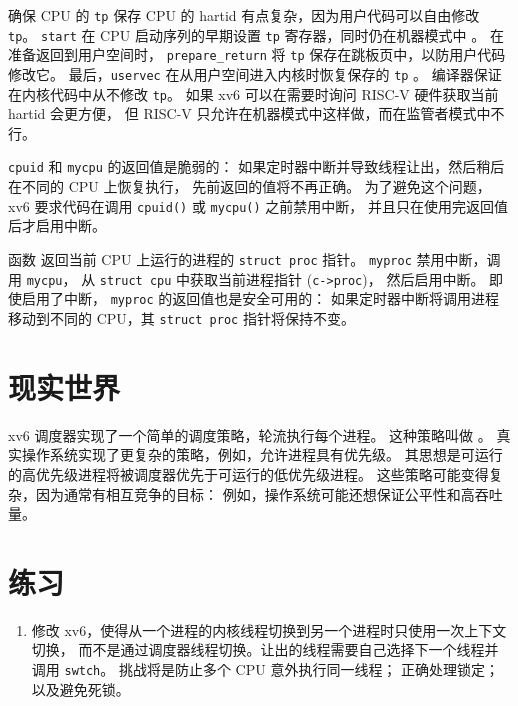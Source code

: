 确保 CPU 的 \lstinline{tp} 保存 CPU 的 hartid 有点复杂，因为用户代码可以自由修改 \lstinline{tp}。
\lstinline{start} 在 CPU 启动序列的早期设置 \lstinline{tp}
寄存器，同时仍在机器模式中
。
在准备返回到用户空间时，
\lstinline{prepare_return} 将 \lstinline{tp} 保存在跳板页中，以防用户代码修改它。
最后，\lstinline{uservec} 在从用户空间进入内核时恢复保存的 \lstinline{tp}
。
编译器保证在内核代码中从不修改 \lstinline{tp}。
如果 xv6 可以在需要时询问 RISC-V 硬件获取当前 hartid 会更方便，
但 RISC-V 只允许在机器模式中这样做，而在监管者模式中不行。

\lstinline{cpuid}
和
\lstinline{mycpu}
的返回值是脆弱的：
如果定时器中断并导致线程让出，然后稍后在不同的 CPU 上恢复执行，
先前返回的值将不再正确。
为了避免这个问题，xv6 要求代码在调用 {\tt cpuid()} 或 {\tt mycpu()} 之前禁用中断，
并且只在使用完返回值后才启用中断。

函数
返回当前 CPU 上运行的进程的
\lstinline{struct proc}
指针。
\lstinline{myproc}
禁用中断，调用
\lstinline{mycpu}，
从
\lstinline{struct cpu}
中获取当前进程指针
(\lstinline{c->proc})，
然后启用中断。
即使启用了中断，
\lstinline{myproc}
的返回值也是安全可用的：
如果定时器中断将调用进程移动到不同的 CPU，其
\lstinline{struct proc}
指针将保持不变。


\section{现实世界}

xv6 调度器实现了一个简单的调度策略，轮流执行每个进程。
这种策略叫做
。
真实操作系统实现了更复杂的策略，例如，允许进程具有优先级。
其思想是可运行的高优先级进程将被调度器优先于可运行的低优先级进程。
这些策略可能变得复杂，因为通常有相互竞争的目标：
例如，操作系统可能还想保证公平性和高吞吐量。

\section{练习}

\begin{enumerate}

\item 修改 xv6，使得从一个进程的内核线程切换到另一个进程时只使用一次上下文切换，
  而不是通过调度器线程切换。让出的线程需要自己选择下一个线程并调用 \texttt{swtch}。
  挑战将是防止多个 CPU 意外执行同一线程；
  正确处理锁定；以及避免死锁。

\end{enumerate}
